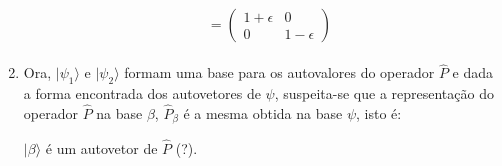 \begin{prob}
\begin{sol}
\begin{enumerate}[label=\alph *)]
\begin{align}
\begin{split}
												&=
								\begin{pmatrix}
									1+\epsilon & 0 \\
									0 & 1-\epsilon
								\end{pmatrix}
							\end{split}
						\end{align}
					\item Ora, $|{\psi_{1}}\rangle$ e $|{\psi_{2}}\rangle$ formam uma base para os autovalores do operador $\hat{P}$ e dada a forma encontrada dos autovetores de $\psi$, suspeita-se que a representação do operador $\hat{P}$ na base $\beta$, $\hat{P}_{\beta}$ é a mesma obtida na base $\psi$, isto é:

						\begin{propos}{$|{\beta}\rangle$ é um autovetor de $\hat{P}$ (?).}
							\label{prop:1}


\end{propos}
\end{enumerate}
\end{sol}
\end{prob}
